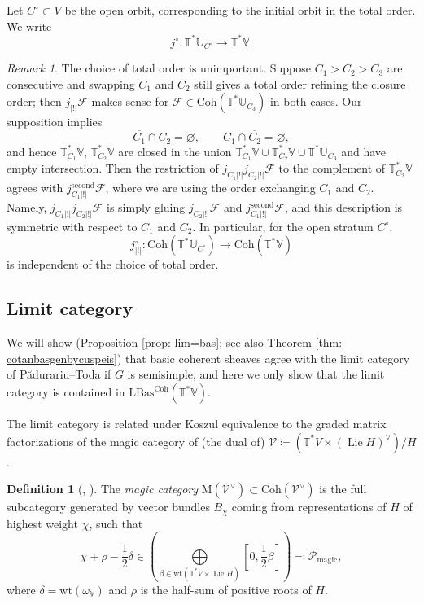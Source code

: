 \documentclass{amsart}
\theoremstyle{definition}
\newtheorem{definition}[theorem]{Definition}
\theoremstyle{remark}
\newtheorem{remark}[theorem]{Remark}
\numberwithin{equation}{section}
\DeclareMathOperator{\Lie}{Lie}
\newcommand{\U}{\mathbb{U}}
\newcommand{\mc}{\mathcal}
\newcommand{\Coh}{\mathrm{Coh}}
\newcommand{\V}{\mathbb{V}}
\newcommand{\T}{\mathbb{T}}
\newcommand{\LBas}{\mathrm{LBas}}
\newcommand{\ush}{\lvert ! \rvert}
\newcommand{\wt}{\mathrm{wt}}
\newcommand{\magic}{\mathrm{magic}}
\newcommand{\M}{\mathrm{M}}
\begin{document}
Let $C^{\circ} \subset V$ be the open orbit, corresponding to the initial orbit in the total order. We write
\begin{equation*}
    j^{\circ}: \T^{\ast}\U_{C^{\circ}} \rightarrow \T^{\ast}\V.
\end{equation*}

\begin{remark}
The choice of total order is unimportant. Suppose $C_1 > C_2 > C_3$ are consecutive and swapping $C_1$ and $C_2$ still gives a total order refining the closure order; then $j_{\ush}\mc F$ makes sense for $\mc F\in \Coh(\T^{\ast}\U_{C_3})$ in both cases. Our supposition implies
\[
\overline{C_1}\cap C_2 =\varnothing, \qquad C_1 \cap \overline{C_2} =\varnothing,
\]
and hence $\T^*_{C_1}\V$, $\T^*_{C_2}\V$ are closed in the union $\T^*_{C_1}\V \cup \T^*_{C_2}\V \cup \T^{\ast}\U_{C_3}$ and have empty intersection. Then the restriction of $j_{C_1 \ush}j_{C_2 \ush}\mc F$ to the complement of $\T^*_{C_2}\V$ agrees with $j_{C_1 \ush}^{\text{second}} \mc F$, where we are using the order exchanging $C_1$ and $C_2$. Namely, $j_{C_1 \ush}j_{C_2 \ush}\mc F$ is simply gluing $j_{C_2\ush}\mc F$ and $j_{C_1 \ush}^{\text{second}} \mc F$, and this description is symmetric with respect to $C_1$ and $C_2$. In particular, for the open stratum $C^\circ$,
\[
j^{\circ}_{\ush} \colon \Coh(\T^{\ast}\U_{C^\circ})\to \Coh (\T^{\ast}\V)
\]
is independent of the choice of total order. 
\end{remark}

\subsection{Limit category}{\label{ss: limcat}}
We will show (Proposition \ref{prop: lim=bas}; see also Theorem \ref{thm: cotanbasgenbycuspeis}) that basic coherent sheaves agree with the limit category of P\u{a}durariu--Toda \cite{PTDolbeault} if $G$ is semisimple, and here we only show that the limit category is contained in $\LBas^\Coh(\T^*\V)$.

The limit category is related under Koszul equivalence to the graded matrix factorizations of the magic category of (the dual of) $\mc{V} \coloneq (\T^*V \times (\Lie H)^\vee)/H$.

\begin{definition}[{\cite[Corollary 3.35]{PTqBPSsymquiverswithpotential}, \cite[Proposition 6.5]{PTDolbeault}}]{\label{defn: magicat}}
    The \emph{magic category} $\M(\mc{V}^{\vee}) \subset \Coh(\mc{V}^{\vee})$ is the full subcategory generated by vector bundles $B_{\chi}$ coming from representations of $H$ of highest weight $\chi$, such that 
    \begin{equation*}
        \chi +\rho - \frac{1}{2}\delta \in \left( \bigoplus\limits_{\beta \in \wt (\T^{\ast} V \times \Lie H)} [0, \frac{1}{2}\beta]\right) \eqqcolon \mc{P}_{\magic},
    \end{equation*}
    where $\delta = \wt(\omega_{\V})$ and $\rho$ is the half-sum of positive roots of $H$. 
\end{definition}
\end{document}
